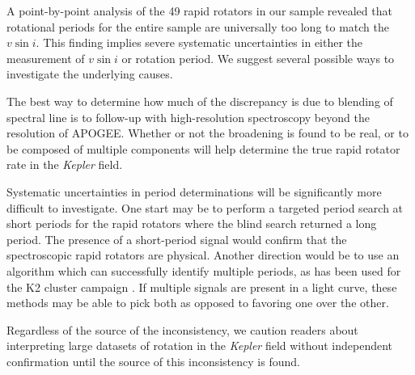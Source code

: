 \documentclass[manuscript]{aastex6}
\newcommand{\vsini}{\ensuremath{v \sin i}}
\newcommand{\Kepler}{\mbox{\textit{Kepler}}}
\begin{document}
A point-by-point analysis of the 49 rapid rotators in our sample revealed that
rotational periods for the entire sample are universally too long to match the 
\vsini{}. This finding implies severe systematic uncertainties in either the
measurement of \vsini{} or rotation period. We suggest several possible ways 
to investigate the underlying causes.

The best way to determine how much of the discrepancy is due to blending of
spectral line is to follow-up with high-resolution spectroscopy beyond the
resolution of APOGEE\@. Whether or not the broadening is found to be real, or to
be composed of multiple components will help determine the true rapid
rotator rate in the \Kepler{} field.

Systematic uncertainties in period determinations will be significantly more
difficult to investigate. One start may be to perform a targeted period search
at short periods for the rapid rotators where the blind search returned a long
period. The presence of a short-period signal would confirm that the
spectroscopic rapid rotators are physical. Another direction would be to use an
algorithm which can successfully identify multiple periods, as has been used
for the K2 cluster campaign \citep{Rebull16,Rebull17}. If multiple signals are
present in a light curve, these methods may be able to pick both as opposed to
favoring one over the other.

Regardless of the source of the inconsistency, we caution readers about 
interpreting large datasets of rotation in the \Kepler{} field without 
independent confirmation until the source of this inconsistency is found.




\end{document}
